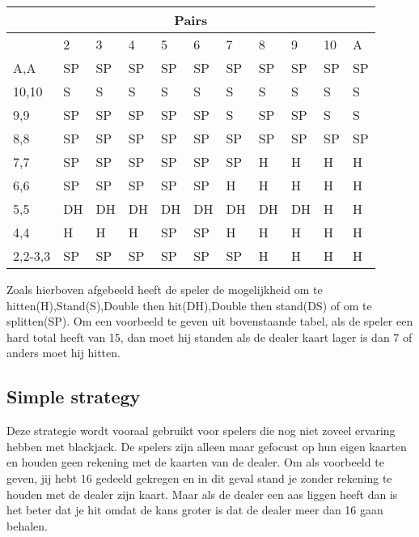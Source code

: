 \documentclass[conference]{IEEEtran}
\begin{document}
\begin{table}[H]
\begin{tabular}{|l|l|l|l|l|l|l|l|l|l|l|}
\multicolumn{11}{|c|}{Pairs}                                                   \\ \hline
                             & 2  & 3  & 4  & 5  & 6  & 7  & 8  & 9  & 10 & A  \\ \hline
A,A                          & SP & SP & SP & SP & SP & SP & SP & SP & SP & SP \\ \hline
10,10                        & S  & S  & S  & S  & S  & S  & S  & S  & S  & S  \\ \hline
9,9                          & SP & SP & SP & SP & SP & S  & SP & SP & S  & S  \\ \hline
8,8                          & SP & SP & SP & SP & SP & SP & SP & SP & SP & SP \\ \hline
7,7                          & SP & SP & SP & SP & SP & SP & H  & H  & H  & H  \\ \hline
6,6                          & SP & SP & SP & SP & SP & H  & H  & H  & H  & H  \\ \hline
5,5                          & DH & DH & DH & DH & DH & DH & DH & DH & H  & H  \\ \hline
4,4                          & H  & H  & H  & SP & SP & H  & H  & H  & H  & H  \\ \hline
2,2-3,3                      & SP & SP & SP & SP & SP & SP & H  & H  & H  & H  \\ \hline
\end{tabular}

\end{table}

Zoals hierboven afgebeeld heeft de speler de mogelijkheid om te hitten(H),Stand(S),Double then hit(DH),Double then stand(DS) of om te splitten(SP). Om een voorbeeld te geven uit bovenstaande tabel, als de speler een hard total heeft van 15, dan moet hij standen als de dealer kaart lager is dan 7 of anders moet hij hitten.





\subsection{Simple strategy}

Deze strategie wordt vooraal gebruikt voor spelers die nog niet zoveel ervaring hebben met blackjack. De spelers zijn alleen maar gefocust op hun eigen kaarten en houden geen rekening met de kaarten van de dealer. Om als voorbeeld te geven, jij hebt 16 gedeeld gekregen en in dit geval stand je zonder rekening te houden met de dealer zijn kaart. Maar als de dealer een aas liggen heeft dan is het beter dat je hit omdat de kans groter is dat de dealer meer dan 16 gaan behalen.
\end{document}
